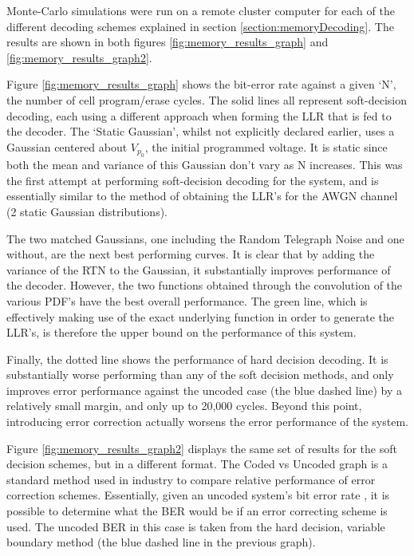 \documentclass[11pt]{article}
\numberwithin{equation}{subsection}
\begin{document}
Monte-Carlo simulations were run on a remote cluster computer for each of the different decoding schemes explained in section \ref{section:memoryDecoding}. The results are shown in both figures \ref{fig:memory_results_graph} and \ref{fig:memory_results_graph2}.

Figure \ref{fig:memory_results_graph} shows the bit-error rate against a given `N', the number of cell program/erase cycles. The solid lines all represent soft-decision decoding, each using a different approach when forming the LLR that is fed to the decoder. The `Static Gaussian', whilst not explicitly declared earlier, uses a Gaussian centered about $V_{p_0}$, the initial programmed voltage. It is static since both the mean and variance of this Gaussian don't vary as N increases. This was the first attempt at performing soft-decision decoding for the system, and is essentially similar to the method of obtaining the LLR's for the AWGN channel (2 static Gaussian distributions).

The two matched Gaussians, one including the Random Telegraph Noise and one without, are the next best performing curves. It is clear that by adding the variance of the RTN to the Gaussian, it substantially improves performance of the decoder. However, the two functions obtained through the convolution of the various PDF's have the best overall performance. The green line, which is effectively making use of the exact underlying function in order to generate the LLR's, is therefore the upper bound on the performance of this system. 

Finally, the dotted line shows the performance of hard decision decoding. It is substantially worse performing than any of the soft decision methods, and only improves error performance against the uncoded case (the blue dashed line) by a relatively small margin, and only up to 20,000 cycles. Beyond this point, introducing error correction actually worsens the error performance of the system. 

Figure \ref{fig:memory_results_graph2} displays the same set of results for the soft decision schemes, but in a different format. The Coded vs Uncoded graph is a standard method used in industry to compare relative performance of error correction schemes. Essentially, given an uncoded system's bit error rate , it is possible to determine what the BER would be if an error correcting scheme is used. The uncoded BER in this case is taken from the hard decision, variable boundary method (the blue dashed line in the previous graph).
\end{document}
